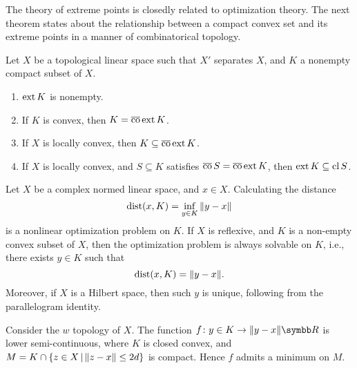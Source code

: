The theory of extreme points is closedly related to optimization theory. The next theorem states about the relationship between a compact convex set and its extreme points in a manner of combinatorical topology.

\begin{theorem}
  Let $X$ be a topological linear space such that $X'$ separates $X$, and $K$ a nonempty compact subset of $X$.
  \begin{enumerate}
    \item $\operatorname{ext} K$ is nonempty.
    \item If $K$ is convex, then $K=\operatorname{\overline{co}}\operatorname{ext} K$.
    \item If $X$ is locally convex, then $K\subseteq \operatorname{\overline{co}}\operatorname{ext} K$.
    \item If $X$ is locally convex, and $S\subseteq K$ satisfies $\operatorname{\overline{co}} S=\operatorname{\overline{co}} \operatorname{ext} K$, then $\operatorname{ext} K\subseteq\operatorname{cl} S$.
  \end{enumerate}
\end{theorem}

\begin{example}
  Let $X$ be a complex normed linear space, and $x\in X$. Calculating the distance
  \begin{equation*}
    \operatorname{dist} (x, K)=\inf_{y\in K}\Vert y-x\Vert
  \end{equation*}
  is a nonlinear optimization problem on $K$. If $X$ is reflexive, and $K$ is a non-empty convex subset of $X$, then the optimization problem is always solvable on $K$, i.e., there exists $y\in K$ such that
  \begin{equation*}
    \operatorname{dist}(x, K)=\Vert y-x\Vert.
  \end{equation*}
  Moreover, if $X$ is a Hilbert space, then such $y$ is unique, following from the parallelogram identity.

  Consider the $w$ topology of $X$. The function $f\colon y\in K\to\NORM{y-x}\RR$ is lower semi-continuous, where $K$ is closed convex, and $M=K\cap\{z\in X\,\vert\, \Vert z-x\Vert\leq 2d\}$ is compact. Hence $f$ admits a minimum on $M$.
\end{example}

